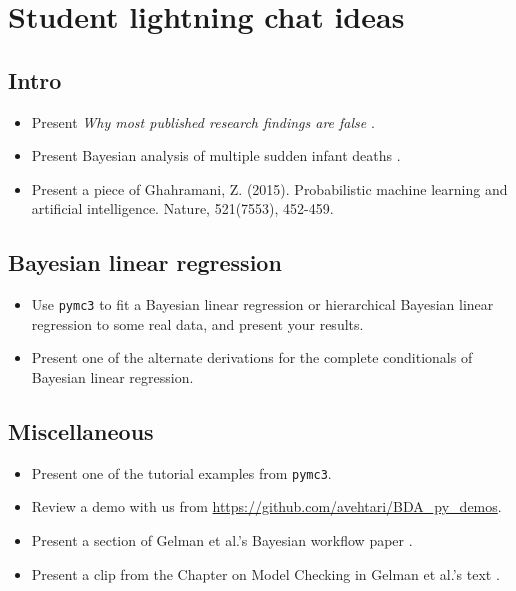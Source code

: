 \documentclass{article} %
\begin{document}
{}



\appendix

\section{Student lightning chat ideas}

\subsection{Intro} 
\begin{itemize}
\item Present \textit{Why most published research findings are false} \cite{ioannidis2005most}.
\item Present Bayesian analysis of multiple sudden infant deaths  \cite{hill2004multiple}.
\item Present a piece of Ghahramani, Z. (2015). Probabilistic machine learning and artificial intelligence. Nature, 521(7553), 452-459.  
\end{itemize}

\subsection{Bayesian linear regression} 
\begin{itemize}
\item Use \texttt{pymc3} to fit a Bayesian linear regression or hierarchical Bayesian linear regression to some real data, and present your results.  
\item Present one of the alternate derivations for the complete conditionals of Bayesian linear regression.
\end{itemize}

\subsection{Miscellaneous} 
\begin{itemize}
\item Present one of the tutorial examples from \texttt{pymc3}.
\item Review a demo with us from \url{https://github.com/avehtari/BDA_py_demos}.
\item Present a section of Gelman et al.'s Bayesian workflow paper \cite{gelman2020bayesian}. 
\item Present a clip from the Chapter on Model Checking in Gelman et al.'s text \cite{gelman2013bayesian}.
\end{itemize}
\end{document}
